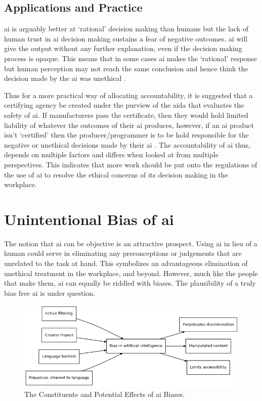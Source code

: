 \documentclass[11pt]{article}
\begin{document}
\subsection{Applications and Practice}
\label{sec:orgef3d8d1}
\gls{ai} is arguably better at `rational' decision making than humans but the lack of human trust in \gls{ai} decision making sustains a fear of negative outcomes.
\gls{ai} will give the output without any further explanation, even if the decision making process is opaque. 
This means that in some cases \gls{ai} makes the `rational' response but human perception may not reach the same conclusion and hence think the decision made by the \gls{ai} was unethical \citep{alaieri2016}.

Thus for a more practical way of allocating accountability, it is suggested that a certifying agency be created under the purview of the \Gls{aida} that evaluates the safety of \gls{ai}. 
If manufacturers pass the certificate, then they would hold limited liability of whatever the outcomes of their \gls{ai} produces, however, if an \gls{ai} product isn't `certified' then the producer/programmer is to be hold responsible for the negative or unethical decisions made by their \gls{ai} \citep{scherer2016}.
The accountability of \gls{ai} thus, depends on multiple factors and differs when looked at from multiple perspectives. 
This indicates that more work should be put onto the regulations of the use of \gls{ai} to resolve the ethical concerns of its decision making in the workplace. 

\section{Unintentional Bias of \acrshort{ai}}
\label{sec:orgf3f1c5c}
The notion that \gls{ai} can be objective is an attractive prospect. 
Using \gls{ai} in lieu of a human could serve in eliminating any preconceptions or judgements that are unrelated to the task at hand. 
This symbolizes an advantageous elimination of unethical treatment in the workplace, and beyond. 
However, much like the people that make them, \gls{ai} can equally be riddled with biases. 
The plausibility of a truly bias free \gls{ai} is under question. 

\begin{figure}[htbp]
\centering
\includegraphics[width=.9\linewidth]{constituents.png}
\caption[Constituents and Effects of \gls{ai} Biases]{The Constituents and Potential Effects of \gls{ai} Biases. \label{fig-constituents}}
\end{figure}
\end{document}
